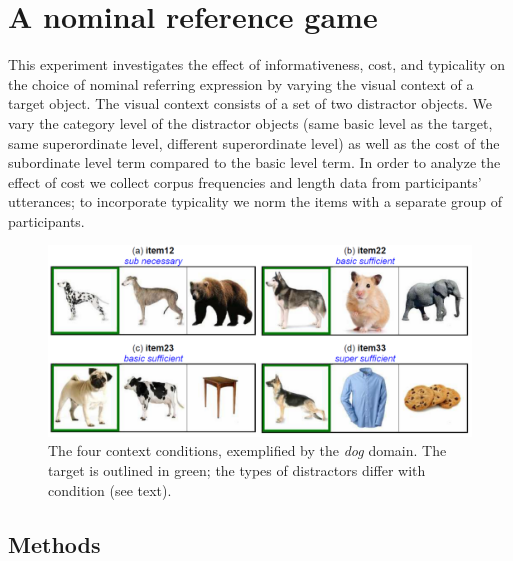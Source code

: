 \documentclass[10pt,letterpaper]{article}
\newcommand{\ndg}[1]{\textcolor{Green}{[ndg: #1]}}
\begin{document}
\section{A nominal reference game}

This experiment investigates the effect of informativeness,  cost, and typicality on the choice of nominal referring expression by varying the visual context of a target object. The visual context consists of a set of two distractor objects. We vary the category level of the distractor objects (same basic level as the target, same superordinate level, different superordinate level) as well as the cost of the subordinate level term compared to the basic level term.
In order to analyze the effect of cost we collect corpus frequencies and length data from participants' utterances; to incorporate typicality we norm the items with a separate group of participants.





\begin{figure}[ht!]
\centering
\includegraphics[width=.5\textwidth]{graphs/design}
\caption{The four context conditions, exemplified by the \textit{dog} domain. The target is outlined in green; the types of distractors differ with condition (see text).
}
\label{fig:design}
\end{figure}

\subsection{Methods}
\end{document}
